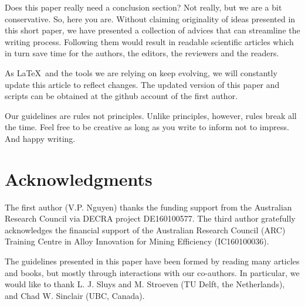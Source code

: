 \documentclass[authoryear,3p,times,preprint,review,fleqn]{elsarticle}
\numberwithin{equation}{section}
\theoremstyle{remark}
\begin{document}
Does this paper really need a conclusion section? Not really, but we are a bit conservative. So, here you are. Without claiming  originality of ideas presented in this short paper, we have presented a collection of  advices that can streamline the writing process. Following them would result in readable scientific articles which in turn save time for the authors,  the editors, the reviewers and the readers.


As \LaTeX\ and the tools we are relying on keep evolving, we will constantly update this article to reflect changes. The updated version of this paper and scripts can be obtained at the github account of the first author.

Our guidelines are rules not principles. Unlike principles, however, rules break all the time. Feel free to be creative as long as you write to inform not to impress. And happy writing.

%
\section*{Acknowledgments}

 The first author (V.P. Nguyen) thanks the funding support from the Australian Research Council via DECRA project DE160100577.  The third  author gratefully acknowledges the financial support of the Australian Research Council (ARC) Training Centre in Alloy Innovation for Mining Efficiency (IC160100036).

 The guidelines presented in this paper have been formed by reading many articles and books, but mostly through interactions with our co-authors. In particular, we would like to thank L. J. Sluys and M. Stroeven (TU Delft, the Netherlands), and Chad W. Sinclair (UBC, Canada).
\end{document}
